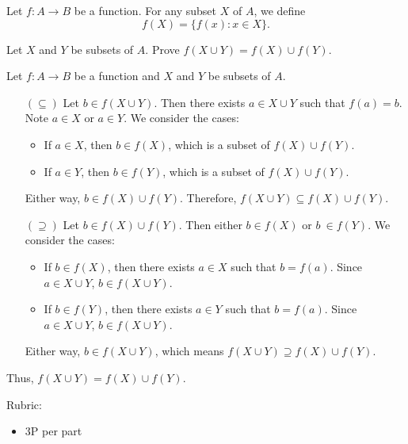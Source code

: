 \documentclass{article}
\theoremstyle{definition}
\begin{document}
\begin{question}{6}
Let \(f\colon A\to B\) be a function.
For any subset \(X\) of \(A\), we define \[ f(X) = \{ f(x) : x \in X \}.\]

Let \(X\) and \(Y\) be subsets of \(A\). Prove \(f(X\cup Y) = f(X) \cup f(Y)\).
\end{question}
\begin{solution}
Let \(f\colon A\to B\) be a function and \(X\) and \(Y\) be subsets of \(A\).
\begin{itemize}
\item[\((\subseteq)\)] Let \(b\in f(X\cup Y)\). Then there exists \(a\in X\cup Y\) such that \(f(a)=b\). Note \(a\in X\) or \(a\in Y\). 
We consider the cases:
\begin{itemize}
    \item If \(a\in X\), then \(b\in f(X)\), which is a subset of \(f(X) \cup f(Y)\). 
    \item If \(a\in Y\), then \(b\in f(Y)\), which is a subset of \(f(X) \cup f(Y)\).
\end{itemize}
 Either way, \(b\in f(X)\cup f(Y)\). Therefore, \(f(X\cup Y) \subseteq f(X) \cup f(Y)\).

\item[\((\supseteq)\)] Let \(b\in f(X)\cup f(Y)\). 
Then either \(b\in f(X)\) or \(b\ \in f(Y)\).
We consider the cases:
\begin{itemize}
    \item If \(b \in f(X)\), then there exists \(a \in X\) such that \(b = f(a)\). Since \(a \in X \cup Y\), \(b \in f(X\cup Y)\).
    \item  If \(b \in f(Y)\), then there exists \(a \in Y\) such that \(b = f(a)\). Since \(a \in X \cup Y\), \(b \in f(X\cup Y)\).
\end{itemize}
Either way, \(b \in f(X\cup Y)\), which means \(f(X\cup Y) \supseteq f(X) \cup f(Y)\).
\end{itemize}
Thus, \(f(X\cup Y) = f(X) \cup f(Y)\).

{\color{red} Rubric:
\begin{itemize}
\item 3P per part
\end{itemize}}
\end{solution}
\end{document}
